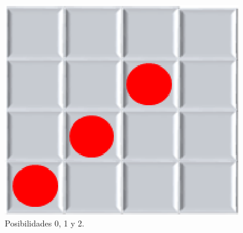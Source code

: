 \begin{figure}[h]
\begin{minipage}[t]{0.3\linewidth}
		\includegraphics[scale=0.5]{contenido/cap4/imagenes/posibilidadesConecta3_02.eps}
	\end{minipage}
	\caption[Posibilidades en el Conecta-3 (I)]{Posibilidades 0, 1 y 2.}
	\label{fig:conecta3_posibilidades1}
\end{figure}

